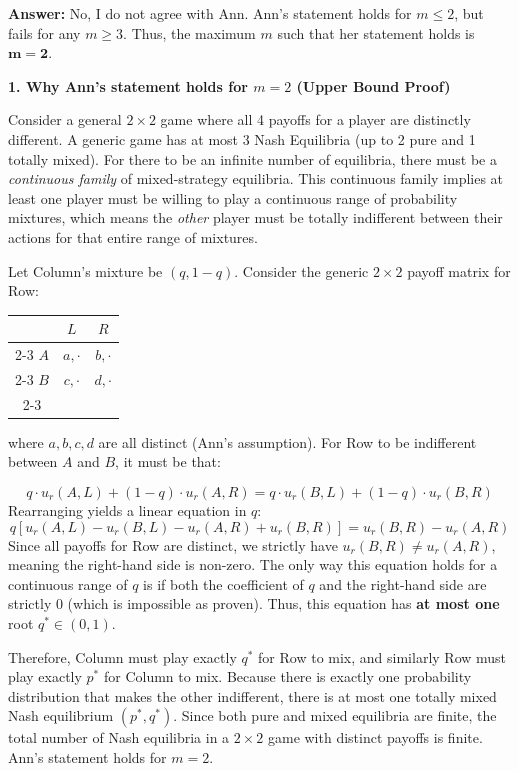 \documentclass{article}
\begin{document}
\textbf{Answer:} No, I do not agree with Ann. Ann's statement holds for $m \le 2$, but fails for any $m \geq 3$. Thus, the maximum $m$ such that her statement holds is $\mathbf{m = 2}$.

\medskip
\noindent\textbf{1. Why Ann's statement holds for $m=2$ (Upper Bound Proof)}

Consider a general $2 \times 2$ game where all 4 payoffs for a player are distinctly different. A generic game has at most 3 Nash Equilibria (up to 2 pure and 1 totally mixed). For there to be an infinite number of equilibria, there must be a \emph{continuous family} of mixed-strategy equilibria. This continuous family implies at least one player must be willing to play a continuous range of probability mixtures, which means the \emph{other} player must be totally indifferent between their actions for that entire range of mixtures.

Let Column's mixture be $(q, 1-q)$. Consider the generic $2\times 2$ payoff matrix for Row:

\begin{center}
\begin{tabular}{c|c|c|}
\multicolumn{1}{c}{} & \multicolumn{1}{c}{$L$} & \multicolumn{1}{c}{$R$} \\ \cline{2-3}
$A$ & $a, \cdot$ & $b, \cdot$ \\ \cline{2-3}
$B$ & $c, \cdot$ & $d, \cdot$ \\ \cline{2-3}
\end{tabular}
\end{center}

where $a, b, c, d$ are all distinct (Ann's assumption). For Row to be indifferent between $A$ and $B$, it must be that:

$$ q \cdot u_r(A, L) + (1-q) \cdot u_r(A, R) = q \cdot u_r(B, L) + (1-q) \cdot u_r(B, R) $$
Rearranging yields a linear equation in $q$:
$$ q [u_r(A, L) - u_r(B, L) - u_r(A, R) + u_r(B, R)] = u_r(B, R) - u_r(A, R) $$
Since all payoffs for Row are distinct, we strictly have $u_r(B, R) \neq u_r(A, R)$, meaning the right-hand side is non-zero. The only way this equation holds for a continuous range of $q$ is if both the coefficient of $q$ and the right-hand side are strictly $0$ (which is impossible as proven). Thus, this equation has \textbf{at most one} root $q^* \in (0, 1)$. 

Therefore, Column must play exactly $q^*$ for Row to mix, and similarly Row must play exactly $p^*$ for Column to mix. Because there is exactly one probability distribution that makes the other indifferent, there is at most one totally mixed Nash equilibrium $(p^*, q^*)$. Since both pure and mixed equilibria are finite, the total number of Nash equilibria in a $2 \times 2$ game with distinct payoffs is finite. Ann's statement holds for $m=2$.
\end{document}
